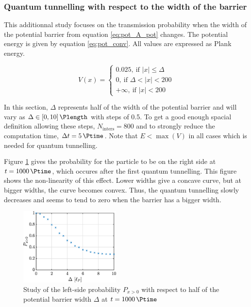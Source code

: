 \documentclass[a4paper,12pt,twoside]{article}
\newcommand{\bracket}[1]{\left(#1\right)}
\begin{document}
      \subsubsection{Quantum tunnelling with respect to the width of the barrier}
        This additionnal study focuses on the transmission probability when the width of the potential barrier from equation \eqref{eq:pot_A_pot} changes.
        The potential energy is given by equation \eqref{eq:pot_conv}.
        All values are expressed as Plank energy.

        \begin{equation}
          V(x) =
          \begin{cases}
            0.025,~\text{if $|x| \leq \Delta$}\\
            0,~\text{if $\Delta < |x| < 200$}\\
            +\infty,~\text{if $|x| < 200$}
          \end{cases}
          \label{eq:pot_conv}
        \end{equation}

        In this section, $\Delta$ represents half of the width of the potential barrier and will vary as $\Delta \in \left[0, 10\right] \si{\Plength}$ with steps of \SI{0.5}{\Plength}.
        To get a good enough spacial definition allowing these steps, $N_\text{inters} = \num{800}$ and to strongly reduce the computation time, $\Delta t = \SI{5}{\Ptime}$.
        Note that $E<\max\bracket{V}$ in all cases which is needed for quantum tunnelling.

        Figure \ref{fig:v_conv_delta} gives the probability for the particle to be on the right side at $t = \SI{1000}{\Ptime}$, which occures after the first quantum tunnelling.
        This figure shows the non-linearity of this effect.
        Lower widths give a concave curve, but at bigger widths, the curve becomes convex.
        Thus, the quantum tunnelling slowly decreases and seems to tend to zero when the barrier has a bigger width.

        \begin{figure}[h]
          \centering
          \includegraphics[width=0.45\textwidth]{graphs/v_conv_delta.eps}
          \caption{Study of the left-side probability $P_{x>0}$ with respect to half of the potential barrier width $\Delta$ at $t=\SI{1000}{\Ptime}$}
          \label{fig:v_conv_delta}
        \end{figure}
\end{document}
